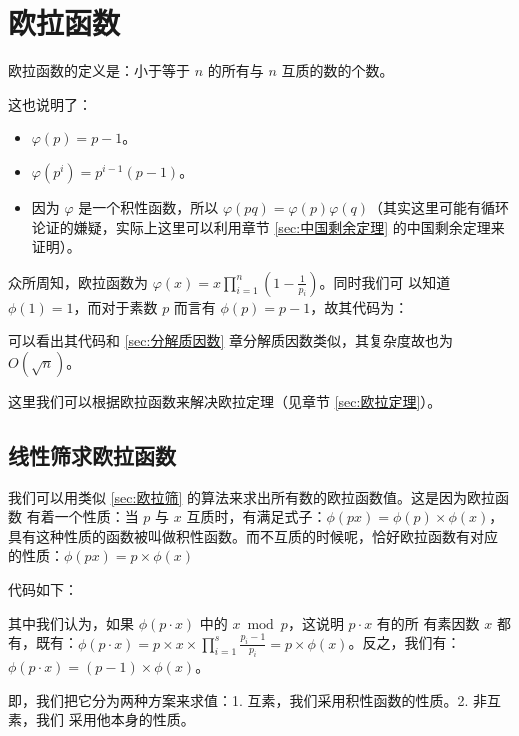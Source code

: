 \section{欧拉函数}
\label{sec:求欧拉函数} \label{sec:欧拉函数}



欧拉函数的定义是：小于等于 $n$ 的所有与 $n$ 互质的数的个数。

这也说明了：
\begin{itemize}
    \item $\varphi(p) = p-1$。
    \item $\varphi(p^i) = p^{i-1}(p - 1)$。
    \item 因为 $\varphi$ 是一个积性函数，所以 $\varphi(pq) = \varphi(p)
        \varphi(q)$（其实这里可能有循环论证的嫌疑，实际上这里可以利用章节
        \ref{sec:中国剩余定理} 的中国剩余定理来证明）。
\end{itemize}

众所周知，欧拉函数为 $\varphi(x) = x \prod^{n}_{i=1}(1-\frac{1}{p_i})$。同时我们可
以知道 $\phi(1) = 1$，而对于素数 $p$ 而言有 $\phi(p) = p - 1$，故其代码为：

可以看出其代码和 \ref{sec:分解质因数} 章分解质因数类似，其复杂度故也为 $O(\sqrt
n)$。

这里我们可以根据欧拉函数来解决欧拉定理（见章节 \ref{sec:欧拉定理}）。



\subsection{线性筛求欧拉函数}
\label{subse:线性筛球欧拉函数} \label{sec:线性筛求欧拉函数}

我们可以用类似 \ref{sec:欧拉筛} 的算法来求出所有数的欧拉函数值。这是因为欧拉函数
有着一个性质：当 $p$ 与 $x$ 互质时，有满足式子：$\phi(p x) = \phi(p) \times
\phi(x)$，具有这种性质的函数被叫做积性函数。而不互质的时候呢，恰好欧拉函数有对应
的性质：$\phi(p x) = p \times \phi(x)$

代码如下：

其中我们认为，如果 $\phi(p \cdot x)$ 中的 $x \bmod p$，这说明 $p \cdot x$ 有的所
有素因数 $x$ 都有，既有：$\phi(p \cdot x) = p \times x \times \prod^{s}_{i=1}
\frac{p_i - 1}{p_i} = p \times \phi(x)$。反之，我们有：$\phi(p \cdot x) = (p -
1) \times \phi(x)$。

即，我们把它分为两种方案来求值：1. 互素，我们采用积性函数的性质。2. 非互素，我们
采用他本身的性质。



